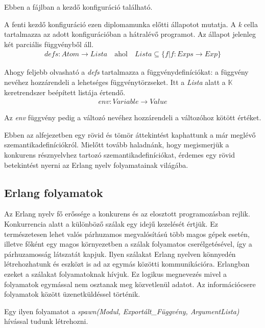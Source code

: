 Ebben a fájlban a kezdő konfiguráció található.



A fenti kezdő konfiguráció ezen diplomamunka előtti állapotot mutatja. A \textit{k} cella tartalmazza az adott konfigurációban a hátralévő programot. Az állapot jelenleg két parciális függvényből áll. 
\begin{align*}
defs: Atom \rightarrow Lista \quad \textrm{ahol} \quad Lista \subseteq \{f | f : Exps \rightarrow Exp\}
\end{align*}

Ahogy feljebb olvasható a \textit{defs} tartalmazza a függvénydefiníciókat: a függvény nevéhez hozzárendeli a lehetséges függvénytörzseket. Itt a \textit{Lista} alatt a $\mathbb{K}$ keretrendszer beépített listája értendő.
\begin{align*}
env: Variable \rightarrow Value
\end{align*}

Az \textit{env} függvény pedig a változó nevéhez hozzárendeli a változóhoz kötött értéket.

Ebben az alfejezetben egy rövid és tömör áttekintést kaphattunk a már meglévő szemantikadefiníciókról. Mielőtt tovább haladnánk, hogy megismerjük a konkurens résznyelvhez tartozó szemantikadefiníciókat, érdemes egy rövid betekintést nyerni az Erlang nyelv folyamatainak világába.

\subsection{Erlang folyamatok}
Az Erlang nyelv fő erőssége a konkurens és az elosztott programozásban rejlik. Konkurrencia alatt a különböző szálak egy idejű kezelését értjük. Ez természetesen lehet valós párhuzamos megvalósítású több magos gépek esetén, illetve főként egy magos környezetben a szálak folyamatos cserélgetésével, így a párhuzamosság látszatát kapjuk. Ilyen szálakat Erlang nyelven könnyedén létrehozhatunk és eszközt is ad az egymás közötti kommunikációra. Erlangban ezeket a szálakat folyamatoknak hívjuk. Ez logikus megnevezés mivel a folyamatok egymással nem osztanak meg közvetlenül adatot. Az információcsere folyamatok között üzenetküldéssel történik.

Egy ilyen folyamatot a \textit{spawn(Modul, Exportált\_Függvény, ArgumentLista)} hívással tudunk létrehozni.



